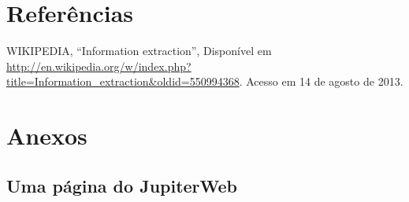 \documentclass[brazil]{article}
\begin{document}
\section{Referências}
	\begin{thebibliography}{99}
	WIKIPEDIA, ``Information extraction'', Disponível em
	\url{http://en.wikipedia.org/w/index.php?title=Information_extraction&oldid=550994368}.
	Acesso em 14 de agosto de 2013.
	\end{thebibliography}

\section{Anexos}
\subsection{Uma página do JupiterWeb}
\end{document}
